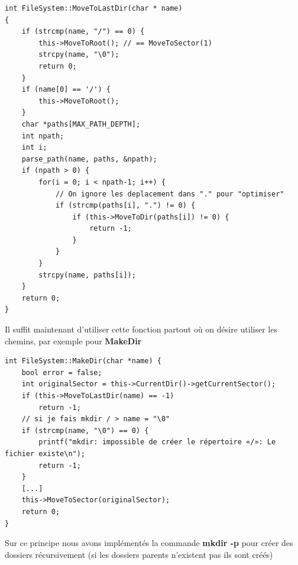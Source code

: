 \documentclass[a4paper,10pt]{article}
\begin{document}
\begin{lstlisting}
int FileSystem::MoveToLastDir(char * name)
{
    if (strcmp(name, "/") == 0) {
        this->MoveToRoot(); // == MoveToSector(1)
        strcpy(name, "\0");
        return 0;
    }
    if (name[0] == '/') {
        this->MoveToRoot();
    }
    char *paths[MAX_PATH_DEPTH];
    int npath;
    int i;
    parse_path(name, paths, &npath);
    if (npath > 0) {
        for(i = 0; i < npath-1; i++) {
            // On ignore les deplacement dans "." pour "optimiser"
            if (strcmp(paths[i], ".") != 0) {
                if (this->MoveToDir(paths[i]) != 0) {
                    return -1;
                }
            }
        }
        strcpy(name, paths[i]);
    }
    return 0;
}
\end{lstlisting}

Il suffit maintenant d'utiliser cette fonction partout où on désire utiliser
les chemins, par exemple pour \textbf{MakeDir}

\begin{lstlisting}
int FileSystem::MakeDir(char *name) {
    bool error = false;
    int originalSector = this->CurrentDir()->getCurrentSector();
    if (this->MoveToLastDir(name) == -1)
        return -1;
    // si je fais mkdir / > name = "\0"
    if (strcmp(name, "\0") == 0) {
        printf("mkdir: impossible de créer le répertoire «/»: Le fichier existe\n");
        return -1;
    }
    [...]
    this->MoveToSector(originalSector);
    return 0;
}
\end{lstlisting}

Sur ce principe nous avons implémentés la commande \textbf{mkdir -p} pour créer
des dossiers récursivement (si les dossiers parents n'existent pas ils sont
créés)
\end{document}
